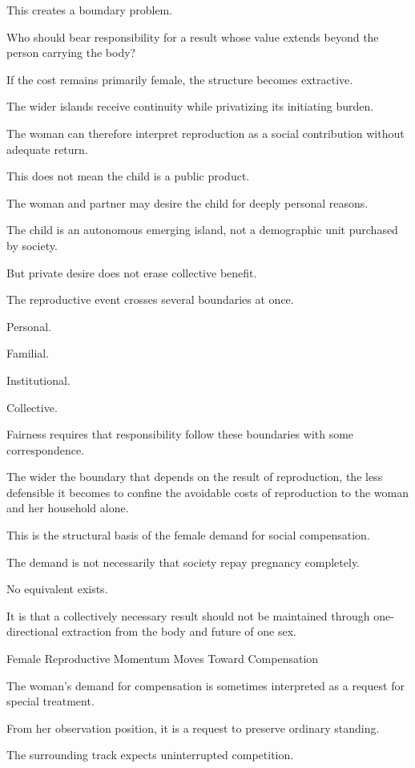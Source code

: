 This creates a boundary problem.

Who should bear responsibility for a result whose value extends beyond the person carrying the body?

If the cost remains primarily female, the structure becomes extractive.

The wider islands receive continuity while privatizing its initiating burden.

The woman can therefore interpret reproduction as a social contribution without adequate return.

This does not mean the child is a public product.

The woman and partner may desire the child for deeply personal reasons.

The child is an autonomous emerging island, not a demographic unit purchased by society.

But private desire does not erase collective benefit.

The reproductive event crosses several boundaries at once.

Personal.

Familial.

Institutional.

Collective.

Fairness requires that responsibility follow these boundaries with some correspondence.

The wider the boundary that depends on the result of reproduction, the less defensible it becomes to confine the avoidable costs of reproduction to the woman and her household alone.

This is the structural basis of the female demand for social compensation.

The demand is not necessarily that society repay pregnancy completely.

No equivalent exists.

It is that a collectively necessary result should not be maintained through one-directional extraction from the body and future of one sex.

Female Reproductive Momentum Moves Toward Compensation

The woman’s demand for compensation is sometimes interpreted as a request for special treatment.

From her observation position, it is a request to preserve ordinary standing.

The surrounding track expects uninterrupted competition.

